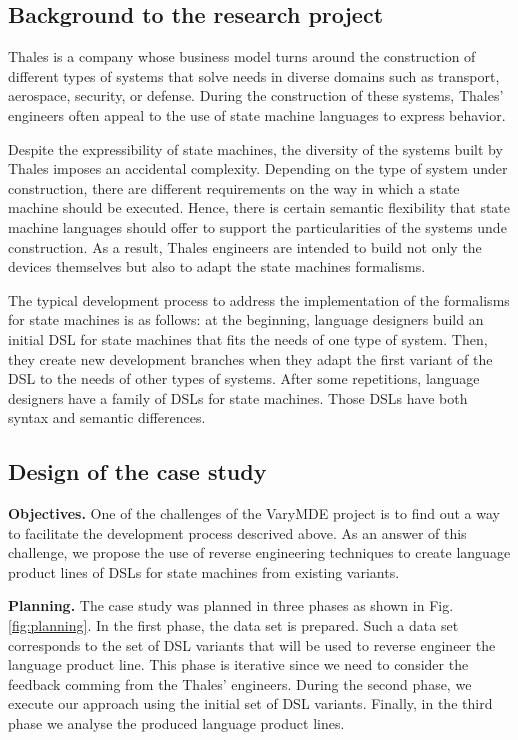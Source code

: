 \subsection{Background to the research project}
Thales is a company whose business model turns around the construction of different types of systems that solve needs in diverse domains such as transport, aerospace, security, or defense. During the construction of these systems, Thales' engineers often appeal to the use of state machine languages to express behavior.

Despite the expressibility of state machines, the diversity of the systems built by Thales imposes an accidental complexity. Depending on the type of system under construction, there are different requirements on the way in which a state machine should be executed. Hence, there is certain semantic flexibility that state machine languages should offer to support the particularities of the systems unde construction. As a result, Thales engineers are intended to build not only the devices themselves but also to adapt the state machines formalisms. 

The typical development process to address the implementation of the formalisms for state machines is as follows: at the beginning, language designers build an initial DSL for state machines that fits the needs of one type of system. Then, they create new development branches when they adapt the first variant of the DSL to the needs of other types of systems. After some repetitions, language designers have a family of DSLs for state machines. Those DSLs have both syntax and semantic differences. 

\subsection{Design of the case study}

\textbf{Objectives.} One of the challenges of the VaryMDE project is to find out a way to facilitate the development process descrived above. As an answer of this challenge, we propose the use of reverse engineering techniques to create language product lines of DSLs for state machines from existing variants.

\vspace{2mm}
\textbf{Planning.} The case study was planned in three phases as shown in Fig. \ref{fig:planning}. In the first phase, the data set is prepared. Such a data set corresponds to the set of DSL variants that will be used to reverse engineer the language product line. This phase is iterative since we need to consider the feedback comming from the Thales' engineers. During the second phase, we execute our approach using the initial set of DSL variants. Finally, in the third phase we analyse the produced language product lines. 

